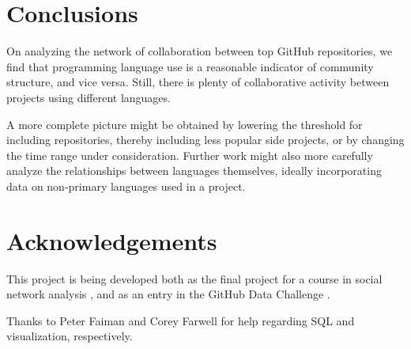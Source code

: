\documentclass[11pt]{article}
\begin{document}
\section{Conclusions}
On analyzing the network of collaboration between top GitHub repositories, we
find that programming language use is a reasonable indicator of community
structure, and vice versa. Still, there is plenty of collaborative activity
between projects using different languages.

A more complete picture might be obtained by lowering the threshold for
including repositories, thereby including less popular side projects, or by
changing the time range under consideration. Further work might also more
carefully analyze the relationships between languages themselves, ideally
incorporating data on non-primary languages used in a project.

\section{Acknowledgements}
This project is being developed both as the final project for a course in social
network analysis \cite{snacourse}, and as an entry in the GitHub Data Challenge
\cite{doll13}.

Thanks to Peter Faiman and Corey Farwell for help regarding SQL and
visualization, respectively.

{\small


}
\end{document}
